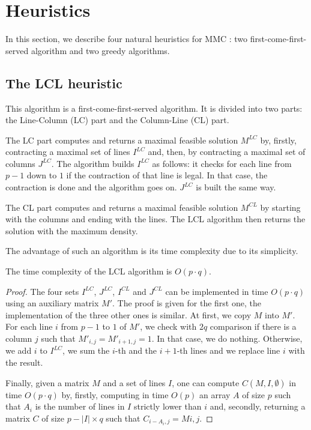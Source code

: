 
\section{Heuristics}
\label{sect:heuristics}

In this section, we describe four natural heuristics for MMC : two first-come-first-served algorithm and two greedy algorithms.

\subsection{The LCL heuristic}

This algorithm is a first-come-first-served algorithm. It is divided into two parts: the Line-Column (LC) part and the Column-Line (CL) part. 

The LC part computes and returns a maximal feasible solution $M^{LC}$ by, firstly, contracting a maximal set of lines $I^{LC}$ and, then, by contracting a maximal set of columns $J^{LC}$. The algorithm builds $I^{LC}$ as follows: it checks for each line from $p-1$ down to $1$ if the contraction of that line is legal. In that case, the contraction is done and the algorithm goes on. $J^{LC}$ is built the same way.

The CL part computes and returns a maximal feasible solution $M^{CL}$ by starting with the columns and ending with the lines. The LCL algorithm then returns the solution with the maximum density.

The advantage of such an algorithm is its time complexity due to its simplicity.

\begin{theorem}
	The time complexity of the LCL algorithm is $O(p \cdot q)$. 
\end{theorem}
\begin{proof}
	The four sets $I^{LC}$, $J^{LC}$, $I^{CL}$ and $J^{CL}$ can be implemented in time $O(p \cdot q)$ using an auxiliary matrix $M'$. The proof is given for the first one, the implementation of the three other ones is similar. At first, we copy $M$ into $M'$. For each line $i$ from $p-1$ to $1$ of $M'$, we check with $2q$ comparison if there is a column $j$ such that $M'_{i,j} = M'_{i+1,j} = 1$. In that case, we do nothing. Otherwise, we add $i$ to $I^{LC}$, we sum the $i$-th and the $i+1$-th lines and we replace line $i$ with the result.
	
	Finally, given a matrix $M$ and a set of lines $I$, one can compute $C(M,I,\emptyset)$ in time $O(p \cdot q)$ by, firstly, computing in time $O(p)$ an array $A$ of size $p$ such that $A_i$ is the number of lines in $I$ strictly lower than $i$ and, secondly, returning a matrix $C$ of size $p - |I| \times q$ such that $C_{i-A_i,j} = M{i,j}$.
\end{proof}

